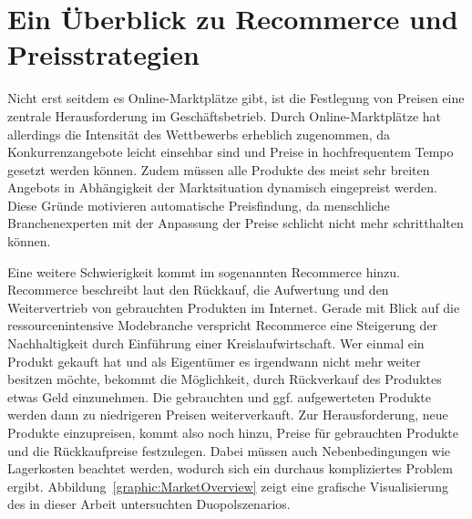 \section{Ein Überblick zu Recommerce und Preisstrategien}
Nicht erst seitdem es Online-Marktplätze gibt, ist die Festlegung von Preisen eine zentrale Herausforderung im Geschäftsbetrieb.
Durch Online-Marktplätze hat allerdings die Intensität des Wettbewerbs erheblich zugenommen, da Konkurrenzangebote leicht einsehbar sind und Preise in hochfrequentem Tempo gesetzt werden können.
Zudem müssen alle Produkte des meist sehr breiten Angebots in Abhängigkeit der Marktsituation dynamisch eingepreist werden.
Diese Gründe motivieren automatische Preisfindung, da menschliche Branchenexperten mit der Anpassung der Preise schlicht nicht mehr schritthalten können.

Eine weitere Schwierigkeit kommt im sogenannten Recommerce hinzu.
Recommerce beschreibt laut \cite{RecommerceDefinition} den Rückkauf, die Aufwertung und den Weitervertrieb von gebrauchten Produkten im Internet.
Gerade mit Blick auf die ressourcenintensive Modebranche verspricht Recommerce eine Steigerung der Nachhaltigkeit durch Einführung einer Kreislaufwirtschaft.
Wer einmal ein Produkt gekauft hat und als Eigentümer es irgendwann nicht mehr weiter besitzen möchte, bekommt die Möglichkeit, durch Rückverkauf des Produktes etwas Geld einzunehmen.
Die gebrauchten und ggf. aufgewerteten Produkte werden dann zu niedrigeren Preisen weiterverkauft.
Zur Herausforderung, neue Produkte einzupreisen, kommt also noch hinzu, Preise für gebrauchten Produkte und die Rückkaufpreise festzulegen.
Dabei müssen auch Nebenbedingungen wie Lagerkosten beachtet werden, wodurch sich ein durchaus kompliziertes Problem ergibt.
\mbox{Abbildung \ref{graphic:MarketOverview}} zeigt eine grafische Visualisierung des in dieser Arbeit untersuchten Duopolszenarios.

